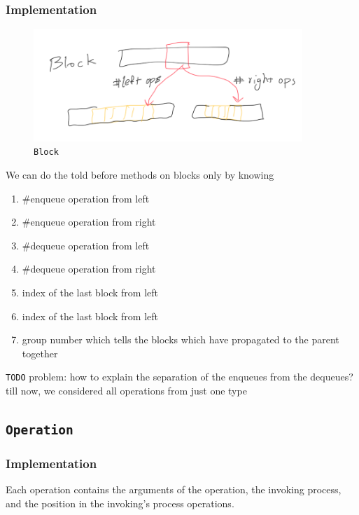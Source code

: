 \documentclass[12pt]{article}
\begin{document}
\subsubsection{Implementation}
\begin{figure}[hbt]
  \center\includegraphics[width=4in]{pics/block}
  \caption{\texttt{Block}}
\end{figure}
We can do the told before methods on blocks only by knowing
\begin{multicols}{2}
\begin{enumerate}
\item \#enqueue operation from left
\item \#enqueue operation from right
\item \#dequeue operation from left
\item \#dequeue operation from right
\item index of the last block from left
\item index of the last block from left
\item group number which tells the blocks which have propagated to the parent together
\end{enumerate}
\end{multicols}
\texttt{TODO} {problem: how to explain the separation of the enqueues from the dequeues? till now, we considered all operations from just one type}

\subsection{\texttt{Operation}}
\subsubsection{Implementation}
Each operation contains the arguments of the operation, the invoking process, and the position in the invoking's process operations.
\end{document}
